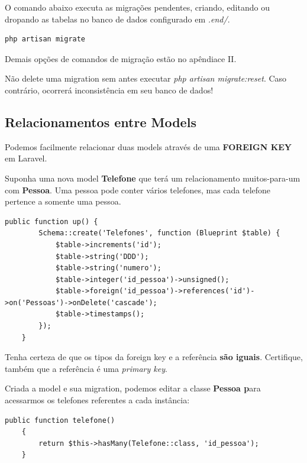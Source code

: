 \documentclass[
12pt,				%
openany,			%
twoside,			%
a4paper,			%
english,			%
french,				%
spanish,			%
brazil,				%
]{abntex2}
\begin{document}
O comando abaixo executa as migrações pendentes, criando, editando ou dropando as tabelas no banco de dados configurado em \textit{.end/}.

\begin{lstlisting}[style=bash,caption={Executando uma migração}]
    php artisan migrate
\end{lstlisting}

Demais opções de comandos de migração estão no apêndiace II.

\begin{leftbar}
    Não delete uma migration sem antes executar \textit{php artisan migrate:reset}. Caso contrário, ocorrerá inconsistência em seu banco de dados!
\end{leftbar}

\subsection{Relacionamentos entre Models}
Podemos facilmente relacionar duas models através de uma \textbf{FOREIGN KEY} em Laravel.

Suponha uma nova model \textbf{Telefone} que terá um relacionamento muitos-para-um com
\textbf{Pessoa}. Uma pessoa pode conter vários telefones, mas cada telefone pertence a somente
uma pessoa.


\begin{lstlisting}[style=php,caption={\textit{Arquivo de migration exemplo 2}}]
    public function up() {
        Schema::create('Telefones', function (Blueprint $table) {
            $table->increments('id');
            $table->string('DDD');
            $table->string('numero');
            $table->integer('id_pessoa')->unsigned();
            $table->foreign('id_pessoa')->references('id')->on('Pessoas')->onDelete('cascade');
            $table->timestamps();
        });
    }
\end{lstlisting}

\begin{leftbar}
    Tenha certeza de que os tipos da foreign key e a referência \textbf{são iguais}. Certifique, também que a referência é uma \textit{primary key}.
\end{leftbar}

Criada a model e sua migration, podemos editar a classe \textbf{Pessoa p}ara acessarmos os telefones referentes a cada instância:

\begin{lstlisting}[style=php,caption={\textit{app/Pessoa.php}}]
    public function telefone() 
    {
        return $this->hasMany(Telefone::class, 'id_pessoa');
    }
\end{lstlisting}
\end{document}
